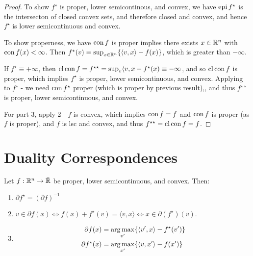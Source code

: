 \begin{proof}
  To show $f^{\star}$ is proper, lower semicontinous, and convex, we
  have $\operatorname*{epi} f^{\star}$ is the intersecton of closed convex sets, and
  therefore closed and convex, and hence $f^{\star}$ is lower
  semicontinuous and convex.

  To show properness, we have $\operatorname*{con} f$ is proper implies there exists
  $x \in \mathbb{R}^{n}$ with $\operatorname*{con} f(x) < \infty$. Then $f^{\star}(v) =
  \sup_{x \in \mathbb{R}^{n}} \{ \langle v, x \rangle - f(x) \}$, which is
  greater than $-\infty$.

  If $f^{\star} \equiv +\infty$, then $\operatorname*{cl} \operatorname*{con} f = f^{\star \star} =
  \sup_{v} \langle v, x - f^{\star}(x) \equiv -\infty$, and so $\operatorname*{cl}
  \operatorname*{con} f$ is proper, which implies $f^{\star}$ is proper, lower
  semicontinuous, and convex.  Applying to $f^{\star}$ - we need $\operatorname*{con}
  f^{\star}$ proper (which is proper by previous result),, and thus $f^{\star
    \star}$ is proper, lower semicontinuous, and convex.

  For part 3, apply 2 - $f$ is convex, which implies $\operatorname*{con} f = f$ and
  $\operatorname*{con} f$ is proper (as $f$ is proper), and $f$ is lsc and convex,
  and thus $f^{\star \star} = \operatorname*{cl} \operatorname*{con} f = f$.
\end{proof}


\section{Duality Correspondences}
\label{sec:dual-corr}

\begin{thm}
  \label{defn:conjugate_functions:7}
  Let $f: \mathbb{R}^{n} \rightarrow \bar {\mathbb{R}}$ be proper, lower semicontinuous,
  and convex. Then:
  \begin{enumerate}
  \item $\partial f^{\star} = (\partial f)^{-1}$
  \item $v \in \partial f(x) \iff f(x) + f^{\star}(v) = \langle v, x
    \rangle \iff x \in \partial (f^{\star})(v)$.
  \item
    \begin{align}
      \label{eq:58}
      \partial f(x) &= \operatorname*{arg\,max}_{v'} \{ \langle v', x \rangle - f^{\star}(v') \}  \\
      \partial f^{\star}(x) &= \operatorname*{arg\,max}_{x'} \{ \langle v, x' \rangle - f(x') \}  \\
    \end{align}

  \end{enumerate}
\end{thm}

